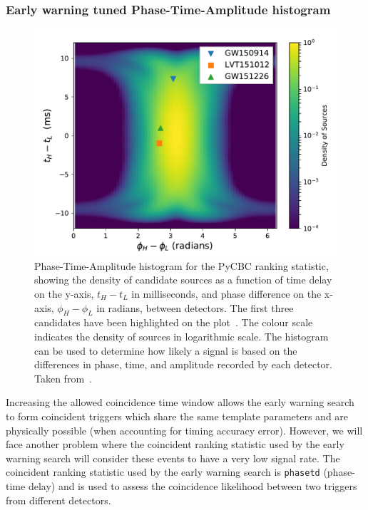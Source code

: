 \subsubsection{\label{6:sec:ew_phasetd}Early warning tuned Phase-Time-Amplitude histogram}
\begin{figure}
    \centering
    \includegraphics[width=1.0\linewidth]{images/6_earlywarning/identified-problems/phase_time.pdf}
    \caption{Phase-Time-Amplitude histogram for the PyCBC ranking statistic, showing the density of \gwadj candidate sources as a function of time delay on the y-axis, $t_H - t_L$ in milliseconds, and phase difference on the x-axis, $\phi_H - \phi_L$ in radians, between detectors. The first three \gwadj candidates have been highlighted on the plot~\cite{gwtc1:2019}. The colour scale indicates the density of sources in logarithmic scale. The histogram can be used to determine how likely a signal is based on the differences in phase, time, and amplitude recorded by each detector. Taken from~\cite{PyCBC:2017}.}
    \label{6:fig:phase-time-histogram}
\end{figure}
%
Increasing the allowed coincidence time window allows the early warning search to form coincident triggers which share the same template parameters and are physically possible (when accounting for timing accuracy error). However, we will face another problem where the coincident ranking statistic used by the early warning search will consider these events to have a very low signal rate. The coincident ranking statistic used by the early warning search is \texttt{phasetd} (phase-time delay) and is used to assess the coincidence likelihood between two triggers from different detectors.


